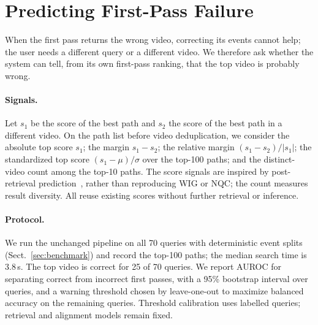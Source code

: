 \section{Predicting First-Pass Failure}
\label{sec:failure_prediction}

When the first pass returns the wrong video, correcting its events cannot help; the user needs a different query or a different video.
We therefore ask whether the system can tell, from its own first-pass ranking, that the top video is probably wrong.

\paragraph{Signals.}
Let $s_1$ be the score of the best path and $s_2$ the score of the best path in a different video.
On the path list before video deduplication, we consider the absolute top score $s_1$; the margin $s_1-s_2$; the relative margin $(s_1-s_2)/|s_1|$; the standardized top score $(s_1-\mu)/\sigma$ over the top-100 paths; and the distinct-video count among the top-10 paths.
The score signals are inspired by post-retrieval prediction~\cite{zhou2007wig,shtok2012nqc,carmel2010difficulty}, rather than reproducing WIG or NQC; the count measures result diversity.
All reuse existing scores without further retrieval or inference.

\paragraph{Protocol.}
We run the unchanged pipeline on all 70 queries with deterministic event splits (Sect.~\ref{sec:benchmark}) and record the top-100 paths; the median search time is 3.8\,s.
The top video is correct for 25 of 70 queries.
We report AUROC for separating correct from incorrect first passes, with a 95\% bootstrap interval over queries, and a warning threshold chosen by leave-one-out to maximize balanced accuracy on the remaining queries.
Threshold calibration uses labelled queries; retrieval and alignment models remain fixed.

